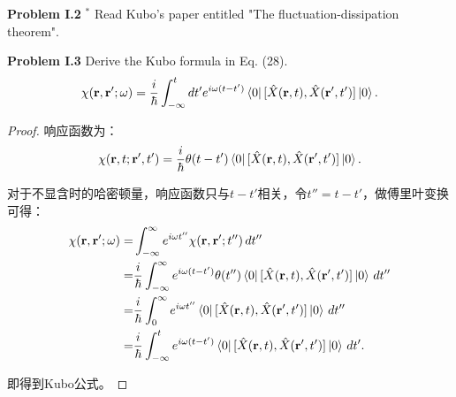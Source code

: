 \documentclass[reqno,a4paper,12pt]{amsart}
\begin{document}
\textbf{Problem I.2} ${}^*$ Read Kubo's paper entitled "The fluctuation-dissipation theorem".


\textbf{Problem I.3} Derive the Kubo formula in Eq. (28).
\[
	\chi(\mathbf{r}, \mathbf{r'}; \omega) = \frac{i}{\hbar} \int_{-\infty}^t dt' e^{i\omega(t-t')} \bra{0} [\hat{X}(\mathbf{r}, t), \hat{X}(\mathbf{r'}, t')] \ket{0}.
\]

\begin{proof}

响应函数为：
\[
	\chi(\mathbf{r},t ;\mathbf{r'},t') = \frac{i}{\hbar}\theta(t-t') \bra{0} [\hat{X}(\mathbf{r}, t), \hat{X}(\mathbf{r'}, t')] \ket{0}.
\]

对于不显含时的哈密顿量，响应函数只与$t-t'$相关，令$t'' = t-t'$，做傅里叶变换可得：
\begin{align*}
	\chi(\mathbf{r},\mathbf{r'}; \omega) =& \int_{-\infty}^\infty e^{i\omega t''} \chi(\mathbf{r},\mathbf{r'};t'') \,dt'' \\
	=& \frac{i}{\hbar} \int_{-\infty}^\infty e^{i\omega(t-t')} \theta(t'') \bra{0} [\hat{X}(\mathbf{r}, t), \hat{X}(\mathbf{r'}, t')] \ket{0} \,dt'' \\
	=& \frac{i}{\hbar} \int_0^\infty e^{i\omega t''} \bra{0} [\hat{X}(\mathbf{r}, t), \hat{X}(\mathbf{r'}, t')] \ket{0} \,dt'' \\
	=& \frac{i}{\hbar} \int_{-\infty}^t e^{i\omega(t-t')} \bra{0} [\hat{X}(\mathbf{r}, t), \hat{X}(\mathbf{r'}, t')] \ket{0} \,dt'.
\end{align*}

即得到Kubo公式。
\end{proof}
\end{document}
